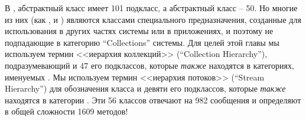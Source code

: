 \documentclass[a4paper,10pt,twoside]{book}
\begin{document}
В \pharo, абстрактный класс  имеет 101 подкласс, а абстрактный класс  -- 50. Но многие из них (как \mbox{,}  и ) являются классами специального предназначения, созданные для использования в других частях системы или в приложениях, и поэтому не подпадающие в категорию ``Collections'' системы. Для целей этой главы мы используем термин <<иерархия коллекций>> (``Collection Hierarchy''), подразумевающий  и 47 его подклассов, которые \emph{также} находятся в категориях, именуемых .
Мы используем термин <<иерархия потоков>> (``Stream Hierarchy'') для обозначения класса  и девяти его подклассов, которые \emph{также} находятся в категории .
Эти 56 классов отвечают на 982 сообщения и определяют в общей сложности 1609 методов!



\end{document}
